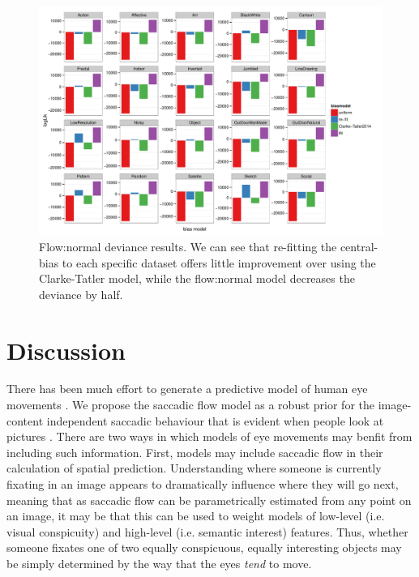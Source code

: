 \documentclass[a4paper, twocolumn, oneside, 10pt]{article}
\begin{document}
\begin{figure}
\centering
 \includegraphics[width=12cm]{../scripts/flow/figs/llh_Borji.pdf}
\caption{Flow:normal deviance results. We can see that re-fitting the central-bias to each specific dataset offers little improvement over using the Clarke-Tatler model, while the flow:normal model decreases the deviance by half.}
\label{fig:nFlowDevBorji}
\end{figure}


\section{Discussion}
There has been much effort to generate a predictive model of human eye movements \citep{mit-saliency-benchmark,judd2009}. We propose the saccadic flow model as a robust prior for the image-content independent saccadic behaviour that is evident when people look at pictures \citep{tatler-vincent2009}. There are two ways in which models of eye movements may benfit from including such information. First, models may include saccadic flow in their calculation of spatial prediction. Understanding where someone is currently fixating in an image appears to dramatically influence where they will go next, meaning that as saccadic flow can be parametrically estimated from any point on an image, it may be that this can be used to weight models of low-level (i.e. visual conspicuity) and high-level (i.e. semantic interest) features. Thus, whether someone fixates one of two equally conspicuous, equally interesting objects may be simply determined by the way that the eyes \textit{tend} to move. 
\end{document}
